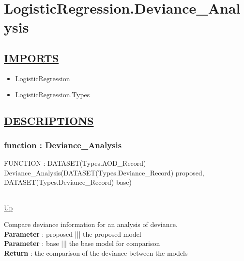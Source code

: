 \chapter*{LogisticRegression.Deviance\_Analysis}
\hypertarget{LogisticRegression.Deviance_Analysis}{}

\section*{\underline{IMPORTS}}
\begin{itemize}
\item LogisticRegression
\item LogisticRegression.Types
\end{itemize}

\section*{\underline{DESCRIPTIONS}}
\subsection*{function : Deviance\_Analysis}
\hypertarget{ecldoc:logisticregression.deviance_analysis}{FUNCTION : DATASET(Types.AOD\_Record) Deviance\_Analysis(DATASET(Types.Deviance\_Record) proposed, DATASET(Types.Deviance\_Record) base)} \\
\hyperlink{ecldoc:}{Up} \\
\par
Compare deviance information for an analysis of deviance. \\
\textbf{Parameter} : proposed ||| the proposed model \\
\textbf{Parameter} : base ||| the base model for comparison \\
\textbf{Return} : the comparison of the deviance between the models \\
